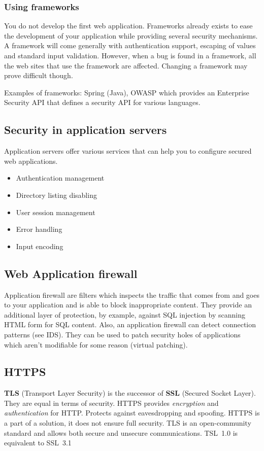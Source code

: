 \subsubsection{Using frameworks}
You do not develop the first web application. Frameworks already exists to
ease the development of your application while providing several security
mechanisms.
A framework will come generally with authentication support, escaping of
values and standard input validation.
However, when a bug is found in a framework, all the web sites that use the
framework are affected. Changing a framework may prove difficult though.

Examples of frameworks: Spring (Java), OWASP which provides an Enterprise
Security API that defines a security API for various languages.

\subsection{Security in application servers}
Application servers offer various services that can help you to configure
secured web applications.

\begin{itemize}
\item Authentication management
\item Directory listing disabling
\item User session management
\item Error handling
\item Input encoding
\end{itemize}

\subsection{Web Application firewall}
Application firewall are filters which inspects the traffic that comes
from and goes to your application and is able to block inappropriate
content.
They provide an additional layer of protection, by example, against
SQL injection by scanning HTML form for SQL content.
Also, an application firewall can detect connection patterns (see IDS).
They can be used to patch security holes of applications which aren't
modifiable for some reason (virtual patching).

\subsection{HTTPS}
\textbf{TLS} (Transport Layer Security) is the successor of \textbf{SSL}
(Secured Socket Layer).
They are equal in terms of security.
HTTPS provides \emph{encryption} and \emph{authentication} for HTTP.
\newline Protects against eavesdropping and spoofing.
HTTPS is a part of a solution, it does not ensure full security.
TLS is an open-community standard and allows both secure and unsecure
communications.
\newline TSL~1.0 is equivalent to SSL~3.1

